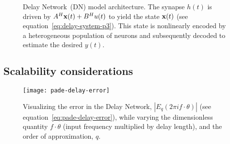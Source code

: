 \begin{figure}
\centering
  \caption{ \label{fig:delay-architecture}
    Delay Network~(DN) model architecture.
    The synapse $h(t)$ is driven by $A^H \mathbf{x}(t) + B^H u(t)$ to yield the state $\mathbf{x}(t)$ (see equation~\ref{eq:delay-system-p3}). 
    This state is nonlinearly encoded by a heterogeneous population of neurons and subsequently decoded to estimate the desired $y(t)$.
  } 
\end{figure}

\subsection{Scalability considerations}
\label{sec:delay-scalability}

\begin{figure}
\centering
  \texttt{[image: pade-delay-error]}
  \caption{ \label{fig:pade-delay-error} 
    Visualizing the error in the Delay Network, $|E_q(2 \pi i f \cdot \theta)|$ (see equation~\ref{eq:pade-delay-error}), while varying the dimensionless quantity $f \cdot \theta$ (input frequency multiplied by delay length), and the order of approximation, $q$.
  } 
\end{figure}

